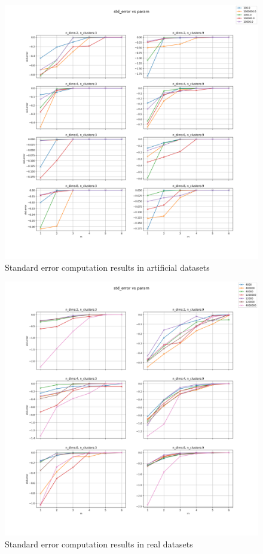 \begin{figure}[!ht]
    \includegraphics[width=\linewidth]{images/experiments/std_error_artificial.png}
    \caption{Standard error computation results in artificial datasets}
    \label{fig:error_art}
\end{figure}

\begin{figure}[!ht]
    \includegraphics[width=\linewidth]{images/experiments/std_error_real.png}
    \caption{Standard error computation results in real datasets}
    \label{fig:error_real}
\end{figure}
